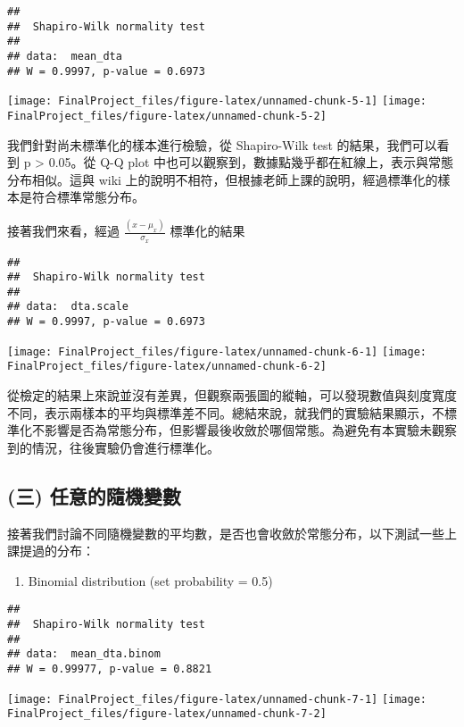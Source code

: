 \documentclass[]{article}
\providecommand{\tightlist}{%
  \setlength{\itemsep}{0pt}\setlength{\parskip}{0pt}}
\begin{document}
\begin{verbatim}
## 
##  Shapiro-Wilk normality test
## 
## data:  mean_dta
## W = 0.9997, p-value = 0.6973
\end{verbatim}

\texttt{[image: FinalProject\_files/figure-latex/unnamed-chunk-5-1]}
\texttt{[image: FinalProject\_files/figure-latex/unnamed-chunk-5-2]}

我們針對尚未標準化的樣本進行檢驗，從 Shapiro-Wilk test
的結果，我們可以看到 p \textgreater{} 0.05。從 Q-Q plot
中也可以觀察到，數據點幾乎都在紅線上，表示與常態分布相似。這與 wiki
上的說明不相符，但根據老師上課的說明，經過標準化的樣本是符合標準常態分布。

接著我們來看，經過 \(\frac{(x-\mu_x)}{\sigma_x}\) 標準化的結果

\begin{verbatim}
## 
##  Shapiro-Wilk normality test
## 
## data:  dta.scale
## W = 0.9997, p-value = 0.6973
\end{verbatim}

\texttt{[image: FinalProject\_files/figure-latex/unnamed-chunk-6-1]}
\texttt{[image: FinalProject\_files/figure-latex/unnamed-chunk-6-2]}

從檢定的結果上來說並沒有差異，但觀察兩張圖的縱軸，可以發現數值與刻度寬度不同，表示兩樣本的平均與標準差不同。總結來說，就我們的實驗結果顯示，不標準化不影響是否為常態分布，但影響最後收斂於哪個常態。為避免有本實驗未觀察到的情況，往後實驗仍會進行標準化。

\hypertarget{-}{%
\subsection{(三) 任意的隨機變數}\label{-}}

接著我們討論不同隨機變數的平均數，是否也會收斂於常態分布，以下測試一些上課提過的分布：

\begin{enumerate}
\def\labelenumi{\arabic{enumi}.}
\tightlist
\item
  Binomial distribution (set probability = 0.5)
\end{enumerate}

\begin{verbatim}
## 
##  Shapiro-Wilk normality test
## 
## data:  mean_dta.binom
## W = 0.99977, p-value = 0.8821
\end{verbatim}

\texttt{[image: FinalProject\_files/figure-latex/unnamed-chunk-7-1]}
\texttt{[image: FinalProject\_files/figure-latex/unnamed-chunk-7-2]}
\end{document}
